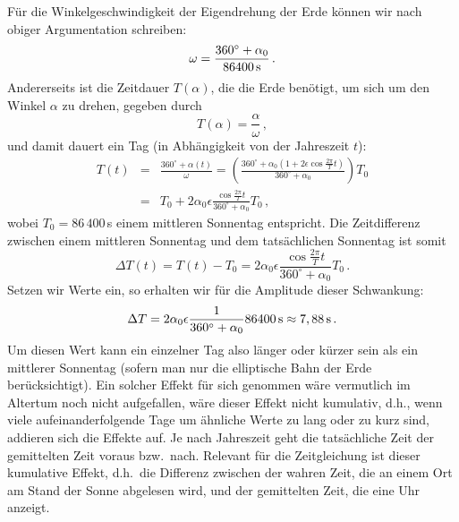 F\"ur die Winkelgeschwindigkeit der Eigendrehung der Erde k\"onnen wir nach obiger
Argumentation schreiben:
\begin{equation}
             \omega = \frac{360^\circ + \alpha_0}{86400\,{\rm s}} \, .
\end{equation}
Andererseits ist die Zeitdauer $T(\alpha)$, die die Erde ben\"otigt, um sich um den Winkel
$\alpha$ zu drehen, gegeben durch
\begin{equation}
             T(\alpha)  = \frac{\alpha}{\omega}     \, , 
\end{equation} 
und damit dauert ein Tag (in Abh\"angigkeit von der Jahreszeit $t$):
\begin{eqnarray}
              T(t) &=& \frac{360^\circ + \alpha(t)}{\omega} 
              = \left( \frac{360^\circ + 
                   \alpha_0( 1 + 2 \epsilon \cos \frac{2\pi}{T}t)}{360^\circ + \alpha_0}\right)  T_0 \\
              &=& T_0 + 2 \alpha_0 \epsilon \frac{\cos  \frac{2\pi}{T}t}{360^\circ + \alpha_0} T_0  \, ,
\end{eqnarray} 
wobei $T_0=86\,400$\,s einem mittleren Sonnentag entspricht.
Die Zeitdifferenz zwischen einem mittleren Sonnentag und dem tats\"achlichen Sonnentag ist
somit
\begin{equation}
\label{eq_Zeitdifferenz}
              \Delta T(t) = T(t)-T_0 =  2 \alpha_0 \epsilon \frac{\cos  \frac{2\pi}{T}t}{360^\circ + \alpha_0}T_0   \, .
\end{equation} 
Setzen wir Werte ein, so erhalten wir f\"ur die Amplitude dieser Schwankung:
\begin{equation}
              \Delta T =  2 \alpha_0 \epsilon \frac{1}{360^\circ + \alpha_0} 86400\,{\rm s} \approx 
                7,88\,{\rm s}   \, .
\end{equation} 
Um diesen Wert kann ein einzelner Tag also l\"anger oder k\"urzer sein als ein mittlerer Sonnentag (sofern
man nur die elliptische Bahn der Erde ber\"ucksichtigt). Ein solcher Effekt f\"ur sich genommen w\"are vermutlich
im Altertum noch nicht aufgefallen, w\"are dieser Effekt nicht kumulativ, d.h., wenn viele aufeinanderfolgende
Tage um \"ahnliche Werte zu lang oder zu kurz sind, addieren sich die Effekte auf. Je nach Jahreszeit
geht die tats\"achliche
Zeit der gemittelten Zeit voraus bzw.\ nach. Relevant f\"ur die Zeitgleichung ist dieser kumulative
Effekt, d.h.\ die Differenz zwischen der wahren Zeit, die an einem Ort am Stand der Sonne abgelesen 
wird, und der gemittelten Zeit, die eine Uhr anzeigt. 

